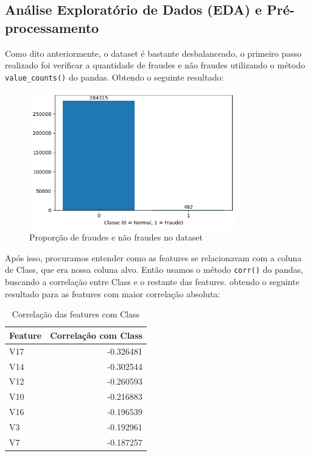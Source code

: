\documentclass[conference]{IEEEtran}
\begin{document}
\subsection{Análise Exploratório de Dados (EDA) e Pré-processamento}
\label{subsec:eda}
  Como dito anteriormente, o dataset é bastante desbalanceado, o primeiro passo realizado foi verificar a quantidade de fraudes e não fraudes utilizando o método \texttt{value\_counts()} do pandas. Obtendo o seguinte resultado:
  \begin{figure}[H]
    \centering
    \includegraphics[width=0.8\textwidth]{../output/proporcao_dados.png}
    \caption{Proporção de fraudes e não fraudes no dataset}
    \label{fig:proporcao_dados}
  \end{figure}
  Após isso, procuramos entender como as features se relacionavam com a coluna de Class, que era nossa coluna alvo. Então usamos o método \texttt{corr()} do pandas, buscando a correlação entre Class e o restante das features. obtendo o seguinte resultado para as features com maior correlação absoluta:
  \begin{table}[H]
    \centering
    \begin{tabular}{lr}
        \toprule
        \textbf{Feature} & \textbf{Correlação com Class} \\
        \midrule
        V17    & -0.326481 \\
        V14    & -0.302544 \\
        V12    & -0.260593 \\
        V10    & -0.216883 \\
        V16    & -0.196539 \\
        V3     & -0.192961 \\
        V7     & -0.187257 \\
        \bottomrule
    \end{tabular}
    \caption{Correlação das features com Class}
    \label{tab:correlacao_features}
\end{table}
\end{document}
